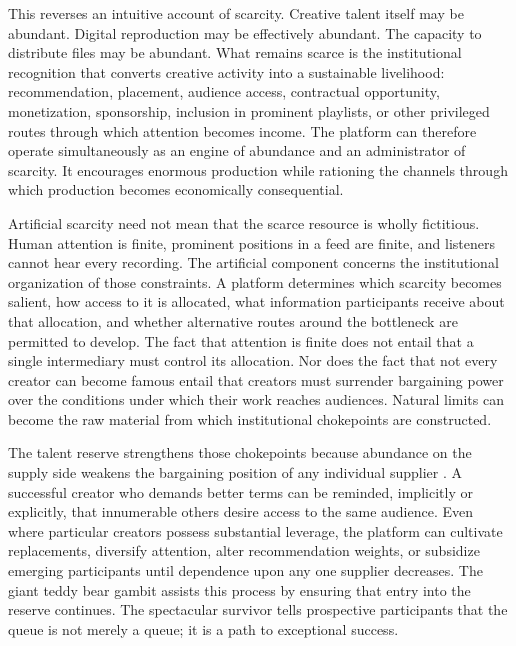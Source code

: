 \documentclass[11pt]{article}
\begin{document}
This reverses an intuitive account of scarcity. Creative talent itself may be abundant. Digital reproduction may be effectively abundant. The capacity to distribute files may be abundant. What remains scarce is the institutional recognition that converts creative activity into a sustainable livelihood: recommendation, placement, audience access, contractual opportunity, monetization, sponsorship, inclusion in prominent playlists, or other privileged routes through which attention becomes income. The platform can therefore operate simultaneously as an engine of abundance and an administrator of scarcity. It encourages enormous production while rationing the channels through which production becomes economically consequential.

Artificial scarcity need not mean that the scarce resource is wholly fictitious. Human attention is finite, prominent positions in a feed are finite, and listeners cannot hear every recording. The artificial component concerns the institutional organization of those constraints. A platform determines which scarcity becomes salient, how access to it is allocated, what information participants receive about that allocation, and whether alternative routes around the bottleneck are permitted to develop. The fact that attention is finite does not entail that a single intermediary must control its allocation. Nor does the fact that not every creator can become famous entail that creators must surrender bargaining power over the conditions under which their work reaches audiences. Natural limits can become the raw material from which institutional chokepoints are constructed.

The talent reserve strengthens those chokepoints because abundance on the supply side weakens the bargaining position of any individual supplier \parencite{azarmarinescu2022monopsony,naidu2024monopsony}. A successful creator who demands better terms can be reminded, implicitly or explicitly, that innumerable others desire access to the same audience. Even where particular creators possess substantial leverage, the platform can cultivate replacements, diversify attention, alter recommendation weights, or subsidize emerging participants until dependence upon any one supplier decreases. The giant teddy bear gambit assists this process by ensuring that entry into the reserve continues. The spectacular survivor tells prospective participants that the queue is not merely a queue; it is a path to exceptional success.
\end{document}
